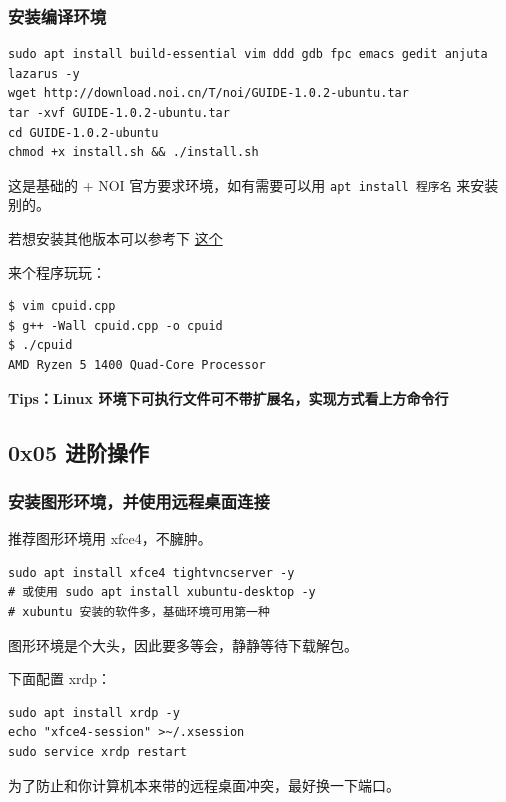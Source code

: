 \subsubsection{安装编译环境}

\begin{verbatim}
sudo apt install build-essential vim ddd gdb fpc emacs gedit anjuta lazarus -y
wget http://download.noi.cn/T/noi/GUIDE-1.0.2-ubuntu.tar
tar -xvf GUIDE-1.0.2-ubuntu.tar
cd GUIDE-1.0.2-ubuntu
chmod +x install.sh && ./install.sh
\end{verbatim}

这是基础的 + NOI 官方要求环境，如有需要可以用 \texttt{apt install 程序名} 来安装别的。

若想安装其他版本可以参考下 \href{https://www.cnblogs.com/EasonJim/p/7144017.html}{这个}

来个程序玩玩：

\begin{verbatim}
$ vim cpuid.cpp
$ g++ -Wall cpuid.cpp -o cpuid
$ ./cpuid
AMD Ryzen 5 1400 Quad-Core Processor
\end{verbatim}

\textbf{Tips：Linux 环境下可执行文件可不带扩展名，实现方式看上方命令行 }

\subsection{0x05 进阶操作}

\subsubsection{安装图形环境，并使用远程桌面连接}

推荐图形环境用 xfce4，不臃肿。

\begin{verbatim}
sudo apt install xfce4 tightvncserver -y
# 或使用 sudo apt install xubuntu-desktop -y
# xubuntu 安装的软件多，基础环境可用第一种
\end{verbatim}

图形环境是个大头，因此要多等会，静静等待下载解包。

下面配置 xrdp：

\begin{verbatim}
sudo apt install xrdp -y
echo "xfce4-session" >~/.xsession
sudo service xrdp restart
\end{verbatim}

 为了防止和你计算机本来带的远程桌面冲突，最好换一下端口。

